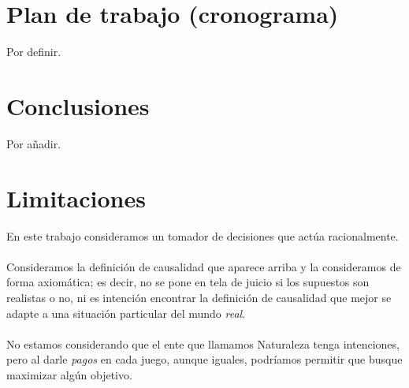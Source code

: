 \documentclass[11pt]{article}
\theoremstyle{plain}
\begin{document}

\section{Plan de trabajo (cronograma)}
Por definir.
\section{Conclusiones}
Por añadir.
\section{Limitaciones}
En este trabajo consideramos un tomador de decisiones que actúa racionalmente.\\
\\
Consideramos la definición de causalidad que aparece arriba y la consideramos de forma axiomática; es decir, no se pone en tela de juicio si los supuestos son realistas o no, ni es intención encontrar la definición de causalidad que mejor se adapte a una situación particular del mundo \textit{real}.\\
\\
No estamos considerando que el ente que llamamos Naturaleza tenga intenciones, pero al darle \textit{pagos} en cada juego, aunque iguales, podríamos permitir que busque maximizar algún objetivo.
\end{document}
